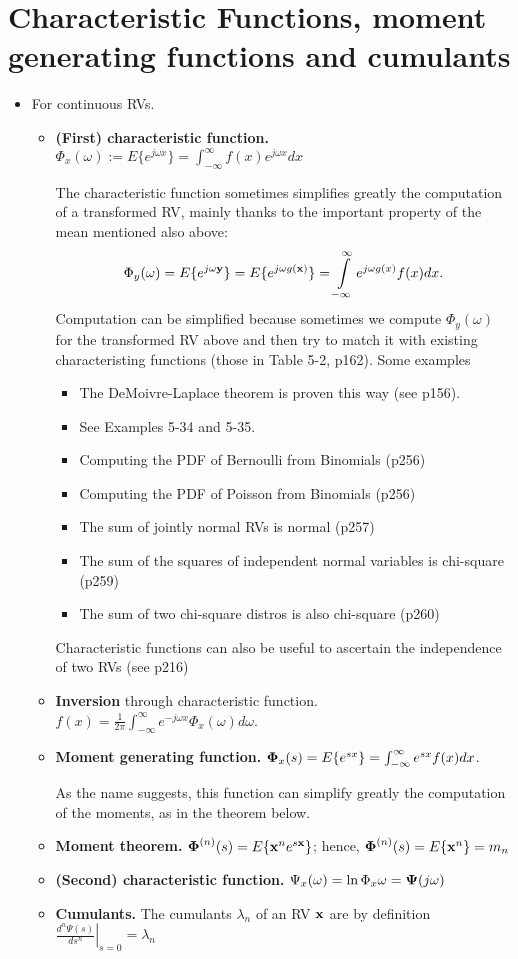 \documentclass[a4paper, oneside]{book}
\begin{document}
\section{Characteristic Functions, moment generating functions and cumulants}
\begin{itemize}
\item For continuous RVs.
	\begin{itemize}
	\item \textbf{(First) characteristic function.} $\Phi_x(\omega) := E\{e^{j\omega x}\} = \int_{-\infty}^{\infty} f(x) e^{j \omega x}dx$
	
	The characteristic function sometimes simplifies greatly the computation of a transformed RV, mainly thanks to the important property of the mean mentioned also above: %
	 $$\Phi_y(\omega) = E\{e^{j\omega \mathbf y}\} = E\{e^{j\omega g(\mathbf x)}\} = \int\limits_{-\infty}^{\infty} e^{j\omega g(x)} f(x) dx.$$ 
	Computation can be simplified because sometimes we compute $\Phi_y(\omega)$ for the transformed RV above and then try to match it with existing characteristing functions (\eg those in Table 5-2, p162). Some examples
	\begin{itemize}
	\item The DeMoivre-Laplace theorem is proven this way (see p156). 
	\item See Examples 5-34 and 5-35.
	\item Computing the PDF of Bernoulli from Binomials (p256)
	\item Computing the PDF of Poisson from Binomials (p256)
	\item The sum of jointly normal RVs is normal (p257)
	\item The sum of the squares of independent normal variables is chi-square (p259)
	\item The sum of two chi-square distros is also chi-square (p260)
\end{itemize}	 
	Characteristic functions can also be useful to ascertain the independence of two RVs (see p216)
	\item \textbf{Inversion} through characteristic function. $f(x) = \frac{1}{2\pi} \int_{-\infty}^\infty e^{-j\omega x} \Phi_x(\omega) d\omega$.
	\item \textbf{Moment generating function.} $\boldsymbol \Phi_x(s) = E\{e^{sx}\} = \int_{-\infty}^{\infty} e^{s x} f(x)dx$.
	
	As the name suggests, this function can simplify greatly the computation of the moments, as in the theorem below.
	\item \textbf{Moment theorem.} $\boldsymbol \Phi^{(n)}(s) = E\{\mathbf x^n e^{s \mathbf x}\}$; hence, $\boldsymbol \Phi^{(n)}(s)=E\{\mathbf x^n\} = m_n$
	\item \textbf{(Second) characteristic function.} $\Psi_x(\omega) = \ln \Phi_x{\omega} = \boldsymbol \Psi (j\omega)$
	\item \textbf{Cumulants.} The cumulants $\lambda_n$ of an RV $\mathbf x$ are by definition $\left.\frac{d^n\Psi(s)}{d s^n}\right|_{s=0}=\lambda_n$
	

\end{itemize}
\end{itemize}
\end{document}
